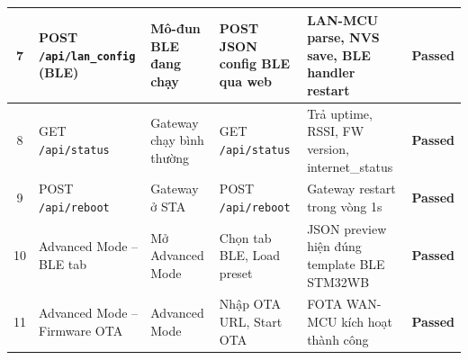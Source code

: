 \begin{longtable}{|c|p{3cm}|p{2cm}|p{4cm}|p{3cm}|c|}
            7 & POST \texttt{/api/lan\_config} (BLE) & Mô-đun BLE đang chạy & POST JSON config BLE qua web & LAN-MCU parse, NVS save, BLE handler restart & \textcolor{modern_blue}{\textbf{Passed}} \\ \hline
        
            8 & GET \texttt{/api/status} & Gateway chạy bình thường & GET \newline\texttt{/api/status} & Trả uptime, RSSI, FW version, internet\_status & \textcolor{modern_blue}{\textbf{Passed}} \\ \hline
        
            9 & POST \texttt{/api/reboot} & Gateway ở STA & POST \newline\texttt{/api/reboot} & Gateway restart trong vòng 1s & \textcolor{modern_blue}{\textbf{Passed}} \\ \hline
        
            10 & Advanced Mode -- BLE tab & Mở Advanced Mode & Chọn tab BLE, Load preset & JSON preview hiện đúng template BLE STM32WB & \textcolor{modern_blue}{\textbf{Passed}} \\ \hline
        
            11 & Advanced Mode -- Firmware OTA & Advanced Mode & Nhập OTA URL, Start OTA & FOTA WAN-MCU kích hoạt thành công & \textcolor{modern_blue}{\textbf{Passed}} \\ \hline
        \end{longtable}
        
        
